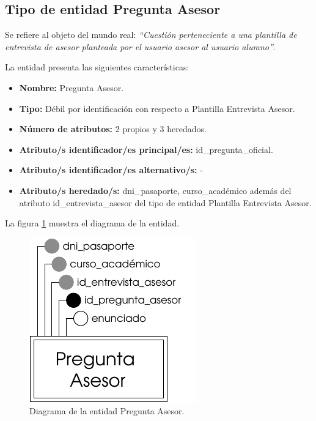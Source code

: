\subsection{Tipo de entidad Pregunta Asesor}

   \begin{description}

   \item[Definición] Se refiere al objeto del mundo real: \emph{``Cuestión
   perteneciente a una plantilla de entrevista de asesor planteada por el
   usuario asesor al usuario alumno''}.

   \item[Características] La entidad presenta las siguientes características:
      \begin{itemize}
         \item \textbf{Nombre:} Pregunta Asesor.
         \item \textbf{Tipo:} Débil por identificación con respecto a
         Plantilla Entrevista Asesor.
         \item \textbf{Número de atributos:} 2 propios y 3 heredados.
         \item \textbf{Atributo/s identificador/es principal/es:} id\_pregunta\_oficial.
         \item \textbf{Atributo/s identificador/es alternativo/s:} -
         \item \textbf{Atributo/s heredado/s:} dni\_pasaporte, curso\_académico
         además del atributo id\_entrevista\_asesor del tipo de entidad
         Plantilla Entrevista Asesor.
      \end{itemize}

   \item[Diagrama] La figura \ref{diagramaPregAse} muestra el diagrama de la entidad.
   \item \begin{figure}[!ht]
            \begin{center}
            \includegraphics[]{07.Modelo_Entidad-Interrelacion/7.2.Analisis_Entidades/diagramas/preg_ase.pdf}
            \caption{Diagrama de la entidad Pregunta Asesor.}
            \label{diagramaPregAse}
            \end{center}
         \end{figure}


\end{description}
